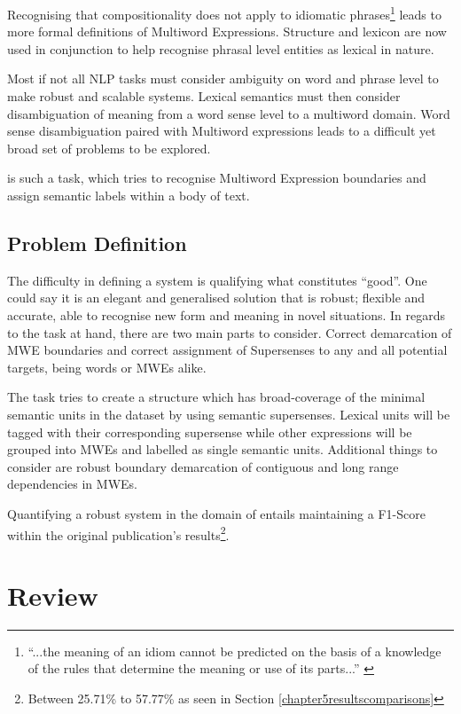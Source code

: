 Recognising that compositionality does not apply to idiomatic phrases\footnote{``...the meaning of an idiom cannot be predicted on the basis of a knowledge of the rules that determine the meaning or use of its parts...'' \cite{nunberg1994idioms}} leads to more formal definitions of Multiword Expressions. Structure and lexicon are now used in conjunction to help recognise phrasal level entities as lexical in nature. 

Most if not all NLP tasks must consider ambiguity on word and phrase level to make robust and scalable systems. Lexical semantics must then consider disambiguation of meaning from a word sense level to a multiword domain. Word sense disambiguation paired with Multiword expressions leads to a difficult yet broad set of problems to be explored.

\dimsum is such a task, which tries to recognise Multiword Expression boundaries and assign semantic labels within a body of text.

\subsection{Problem Definition}

The difficulty in defining a system is qualifying what constitutes ``good''. One could say it is an elegant and generalised solution that is robust; flexible and accurate, able to recognise new form and meaning in novel situations. In regards to the task at hand, there are two main parts to consider. Correct demarcation of MWE boundaries and correct assignment of Supersenses to any and all potential targets, being words or MWEs alike.

The \dimsum task tries to create a structure which has broad-coverage of the minimal semantic units in the dataset by using semantic supersenses. Lexical units will be tagged with their corresponding supersense while other expressions will be grouped into MWEs and labelled as single semantic units. Additional things to consider are robust boundary demarcation of contiguous and long range dependencies in MWEs.

Quantifying a robust system in the domain of \dimsum entails maintaining a F1-Score within the original publication's results\footnote{Between 25.71\% to 57.77\% as seen in Section \ref{chapter5resultscomparisons}}.

\section{Review}

